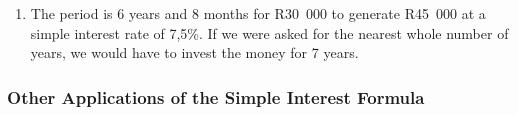 {\begin{mdframed}[linewidth=4, leftmargin=40, rightmargin=40]
\begin{exercise}
\begin{enumerate}[noitemsep, label=\textbf{Step} \textbf{\arabic*}. ]
{\begin{minipage}{\columnwidth}
    \parbox[t]{\mymathboxwidth}{\large\begin{math}
    A=P\left(1+i\ensuremath{\cdot}n\right)R45\phantom{\rule{3.33333pt}{0ex}}000=R30\phantom{\rule{3.33333pt}{0ex}}000\left(1+n\ensuremath{\times}7,5\%\right)\left(1+0,075\ensuremath{\times}n\right)=\frac{45000}{30000}0,075\ensuremath{\times}n=1,5-1n=\frac{0,5}{0,075}n=6,6666667n=6\phantom{\rule{1mm}{0ex}}\mathrm{years}\phantom{\rule{1mm}{0ex}}8\phantom{\rule{1mm}{0ex}}\mathrm{months}\end{math}}\hfill
    \parbox[t]{48pt}{\raggedleft 
    (3.11)}
    \end{minipage}\vspace{12pt}\par
    }%
    
        
        \item  
        
        \label{m39332*id70878}The period is 6 years and 8 months for R30~000 to generate R45~000 at a simple interest rate of 7,5\%. If we were asked for the nearest whole number of years, we would have to invest the money for 7 years.\par 
        \end{enumerate}
         

    \end{exercise}
    \end{mdframed}
    }
    \noindent
  
      
      \label{m39332*uid41}
            \subsubsection{ Other Applications of the Simple Interest Formula}
            \nopagebreak
            
        
\par
            \label{m39332*secfhsst!!!underscore!!!id1464}\vspace{.5cm} 
      
